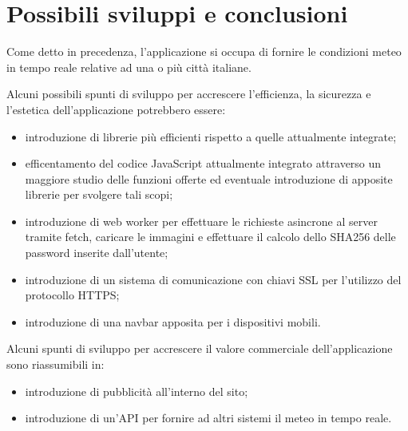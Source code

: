 \chapter{Possibili sviluppi e conclusioni}

Come detto in precedenza, l'applicazione si occupa di fornire le condizioni meteo in tempo reale relative ad una o più città italiane.

\vspace{5mm}

Alcuni possibili spunti di sviluppo per accrescere l'efficienza, la sicurezza e l'estetica dell'applicazione potrebbero essere:
\begin{itemize}
    \item introduzione di librerie più efficienti rispetto a quelle attualmente integrate;
    \item efficentamento del codice JavaScript attualmente integrato attraverso un maggiore studio delle funzioni offerte ed eventuale 
    introduzione di apposite librerie per svolgere tali scopi;
    \item introduzione di web worker per effettuare le richieste asincrone al server tramite fetch, caricare le immagini e effettuare 
    il calcolo dello SHA256 delle password inserite dall'utente;
    \item introduzione di un sistema di comunicazione con chiavi SSL per l'utilizzo del protocollo HTTPS;
    \item introduzione di una navbar apposita per i dispositivi mobili.
\end{itemize}

\vspace{5mm}

Alcuni spunti di sviluppo per accrescere il valore commerciale dell'applicazione sono riassumibili in:
\begin{itemize}
    \item introduzione di pubblicità all'interno del sito;
    \item introduzione di un'API per fornire ad altri sistemi il meteo in tempo reale.
\end{itemize}